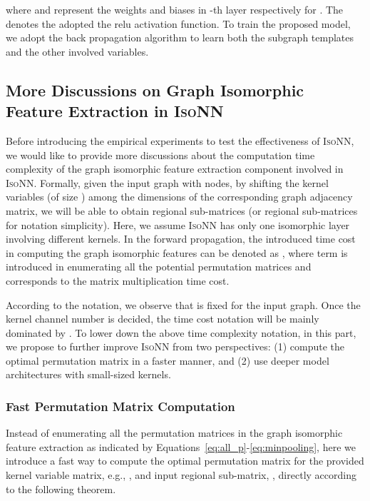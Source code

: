 \documentclass{article} \usepackage{iclr2020_conference,times}
\newcommand{\our}{\textsc{IsoNN}}
\begin{document}
where  and  represent the weights and biases in -th layer respectively for . The  denotes the adopted the relu activation function. To train the proposed model, we adopt the back propagation algorithm to learn both the subgraph templates and the other involved variables.




\subsection{More Discussions on Graph Isomorphic Feature Extraction in {\our}}\label{subsec:discus}

Before introducing the empirical experiments to test the effectiveness of {\our}, we would like to provide more discussions about the computation time complexity of the graph isomorphic feature extraction component involved in {\our}. Formally, given the input graph  with  nodes, by shifting the kernel variables (of size ) among the dimensions of the corresponding graph adjacency matrix, we will be able to obtain  regional sub-matrices (or  regional sub-matrices for notation simplicity). Here, we assume {\our} has only one isomorphic layer involving  different kernels. In the forward propagation, the introduced time cost in computing the graph isomorphic features can be denoted as , where term  is introduced in enumerating all the potential permutation matrices and  corresponds to the matrix multiplication time cost.

According to the notation, we observe that  is fixed for the input graph. Once the kernel channel number  is decided, the time cost notation will be mainly dominated by . To lower down the above time complexity notation, in this part, we propose to further improve {\our} from two perspectives: (1) compute the optimal permutation matrix in a faster manner, and (2) use deeper model architectures with small-sized kernels.

\vspace*{-10pt}
\subsubsection{Fast Permutation Matrix Computation}
\vspace*{-5pt}
Instead of enumerating all the permutation matrices in the graph isomorphic feature extraction as indicated by Equations~\ref{eq:all_p}-\ref{eq:minpooling}, here we introduce a fast way to compute the optimal permutation matrix for the provided kernel variable matrix, e.g., , and input regional sub-matrix, , directly according to the following theorem.
 
\end{document}
